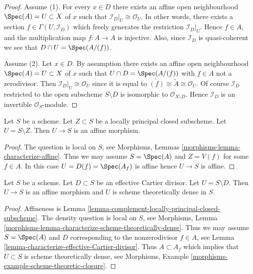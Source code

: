 \begin{proof}
Assume (1).  For every $x \in D$ there exists an affine open neighbourhood
$\Spec(A) = U \subset X$ of $x$ such that
$\mathcal{I}_D|_U \cong \mathcal{O}_U$. In other words, there exists
a section $f \in \Gamma(U, \mathcal{I}_D)$ which freely generates the
restriction $\mathcal{I}_D|_U$. Hence $f \in A$, and the multiplication
map $f : A \to A$ is injective. Also, since $\mathcal{I}_D$ is
quasi-coherent we see that $D \cap U = \Spec(A/(f))$.

\medskip\noindent
Assume (2). Let $x \in D$. By assumption there exists an affine open
neighbourhood $\Spec(A) = U \subset X$ of $x$ such that
$U \cap D = \Spec(A/(f))$ with $f \in A$ not a zerodivisor.
Then $\mathcal{I}_D|_U \cong \mathcal{O}_U$ since it is equal to
$\widetilde{(f)} \cong \widetilde{A} \cong \mathcal{O}_U$.
Of course $\mathcal{I}_D$ restricted to the open subscheme
$S \setminus D$ is isomorphic to $\mathcal{O}_{X \setminus D}$.
Hence $\mathcal{I}_D$ is an invertible $\mathcal{O}_S$-module.
\end{proof}

\begin{lemma}
\label{lemma-complement-locally-principal-closed-subscheme}
Let $S$ be a scheme. Let $Z \subset S$ be a locally principal closed
subscheme. Let $U = S \setminus Z$. Then $U \to S$ is an affine morphism.
\end{lemma}

\begin{proof}
The question is local on $S$, see
Morphisms, Lemmas \ref{morphisms-lemma-characterize-affine}.
Thus we may assume $S = \Spec(A)$ and $Z = V(f)$ for some $f \in A$.
In this case $U = D(f) = \Spec(A_f)$ is affine hence $U \to S$ is affine.
\end{proof}

\begin{lemma}
\label{lemma-complement-effective-Cartier-divisor}
Let $S$ be a scheme. Let $D \subset S$ be an effective Cartier divisor.
Let $U = S \setminus D$. Then $U \to S$ is an affine morphism and $U$
is scheme theoretically dense in $S$.
\end{lemma}

\begin{proof}
Affineness is Lemma \ref{lemma-complement-locally-principal-closed-subscheme}.
The density question is local on $S$, see
Morphisms, Lemma \ref{morphisms-lemma-characterize-scheme-theoretically-dense}.
Thus we may assume $S = \Spec(A)$ and $D$ corresponding to the
nonzerodivisor $f \in A$, see
Lemma \ref{lemma-characterize-effective-Cartier-divisor}.
Thus $A \subset A_f$ which implies that $U \subset S$ is
scheme theoretically dense, see
Morphisms, Example \ref{morphisms-example-scheme-theoretic-closure}.
\end{proof}

